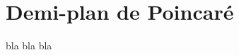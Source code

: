 \documentclass[work\french\developpements\main.tex]{subfiles}
\begin{document}
\section{Demi-plan de Poincaré}
bla bla bla
\end{document}
